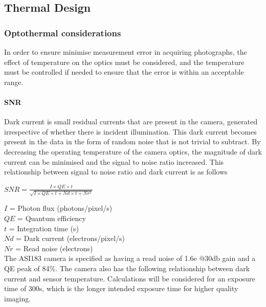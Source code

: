 \pagebreak
\subsection{Thermal Design} \label{Thermal_section}
\subsubsection{Optothermal considerations}

In order to ensure minimise measurement error in acquiring photographs, the effect of temperature on the optics must be considered, and the temperature must be controlled if needed to ensure that the error is within an acceptable range.\

\paragraph{SNR}

Dark current is small residual currents that are present in the camera, generated irrespective of whether there is incident illumination. This dark current becomes present in the data in the form of random noise that is not trivial to subtract. By decreasing the operating temperature of the camera optics, the magnitude of dark current can be minimised and the signal to noise ratio increased. This relationship between signal to noise ratio and dark current is as follows\\

\begin{center}
 $SNR =  \frac{I\times QE\times t}{\sqrt{I\times QE\times t+Nd\times t+Nr^2}}$\\
\end{center}

$I$ = Photon flux (photons/pixel/s)\\
$QE$ = Quantum efficiency\\
$t$ = Integration time (s)\\
$Nd$ = Dark current (electrons/pixel/s)\\
$Nr$ = Read noise (electrons)\\

The ASI183 camera is specified as having a read noise of 1.6e @30db gain and a QE peak of 84\%. The camera also has the following relationship between dark current and sensor temperature. Calculations will be considered for an exposure time of 300s, which is the longer intended exposure time for higher quality imaging.  \\


